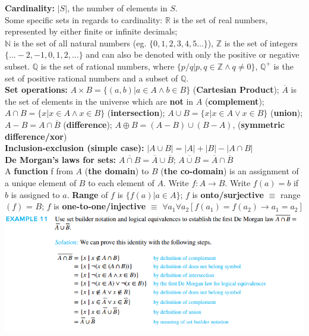 \documentclass[12pt]{article}
\newcommand{\R}{\mathbb{R}}
\newcommand{\N}{\mathbb{N}}
\newcommand{\Z}{\mathbb{Z}}
\begin{document}
\textbf{Cardinality:} $|S|$, the number of elements in $S$. \\
Some specific sets in regards to cardinality: $\R$ is the set of real numbers, represented by either finite or infinite decimals; \\
$\N$ is the set of all natural numbers (eg. $\{0,1,2,3,4,5...\}$), $\Z$ is the set of integers $\{... -2, -1, 0, 1, 2, ...\}$ and can also be denoted with only the positive or negative subset. $\mathbb{Q}$ is the set of rational numbers, where $\{ p / q | p, q \in \Z \wedge q \neq 0 \}$, $\mathbb{Q}^+$ is the set of positive rational numbers and a subset of $\mathbb{Q}$. \\
\textbf{Set operations:} $A \times B = \{ (a,b) | a \in A \wedge b \in B\}$ (\textbf{Cartesian Product}); $\overline{A}$ is the set of elements in the universe which are \textbf{not} in $A$ (\textbf{complement}); $A \cap B = \{ x | x \in A \wedge x \in B\}$ (\textbf{intersection}); $A \cup B = \{ x | x \in A \vee x \in B\}$ (\textbf{union}); \\
$A - B = A \cap \overline{B}$ (\textbf{difference}); $A \oplus B = (A - B) \cup (B - A)$, (\textbf{symmetric difference/xor}) \\
\textbf{Inclusion-exclusion (simple case):} $|A \cup B| = |A| + |B| - |A \cap B|$\\
\textbf{De Morgan's laws for sets:} $\overline{A \cap B} = \overline{A} \cup \overline{B}$; $\overline{A \cup B} = \overline{A} \cap \overline{B}$ \\
A \textbf{function} f from $A$ (\textbf{the domain}) to $B$ (\textbf{the co-domain}) is an assignment of a unique element of $B$ to each element of $A$. Write $f: A \rightarrow B$. Write $f(a) = b$ if $b$ is assigned to $a$. \textbf{Range} of $f$ is $\{ f(a) | a \in A\}$; $f$ is \textbf{onto/surjective} $\equiv$ range $(f)$ = $B$; $f$ is \textbf{one-to-one/injective} $\equiv$ $\forall a_1 \forall a_2 [f(a_1) = f(a_2) \rightarrow a_1 = a_2]$ \\
\includegraphics[scale=0.8]{set_de_morgan} \\
\end{document}
